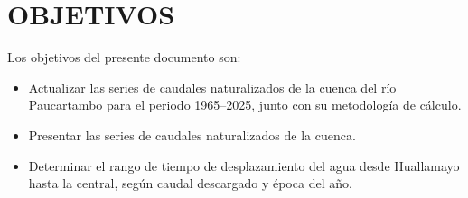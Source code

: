 \section{OBJETIVOS}
Los objetivos del presente documento son:
\begin{itemize}
    \item Actualizar las series de caudales naturalizados de la cuenca del río Paucartambo para el periodo 1965--2025, junto con su metodología de cálculo.
    \item Presentar las series de caudales naturalizados de la cuenca.
    \item Determinar el rango de tiempo de desplazamiento del agua desde Huallamayo hasta la central, según caudal descargado y época del año.
\end{itemize}
